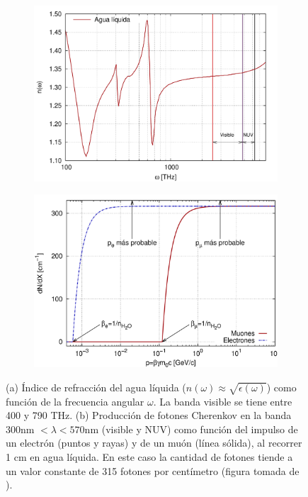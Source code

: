 \documentclass[12pt,oneside,openany,letter]{book}
\begin{document}
\begin{figure}
    \centering
    \begin{subfigure}{0.45\textwidth}
        \includegraphics[width=\textwidth]{images/asorey1.png}
        \caption{}
        \label{asorey1}
    \end{subfigure}
        \begin{subfigure}{0.45\textwidth}
        \includegraphics[width=\textwidth]{images/asorey2.png}
        \caption{}
        \label{asorey2}
    \end{subfigure}
   \caption[Índice de refracción del agua líquida como función de la
frecuencia angular y producción de fotones Cherenkov en la banda visible y NUV]{(a) Índice de refracción del agua líquida ($n(\omega)\approx \sqrt{\epsilon(\omega)}$) como función de la
frecuencia angular $\omega$. La banda visible se tiene entre 400 y 790 THz. (b) Producción de fotones Cherenkov en la banda 300nm $< \lambda < 570$nm (visible
y NUV) como función del impulso de un electrón (puntos y rayas) y de un
muón (línea sólida), al recorrer 1 cm en agua líquida. En este caso la cantidad de fotones tiende a un valor constante de 315 fotones por centímetro (figura tomada de \cite{Asorey-phd2012}).}\label{asorey}
\end{figure}
\end{document}
